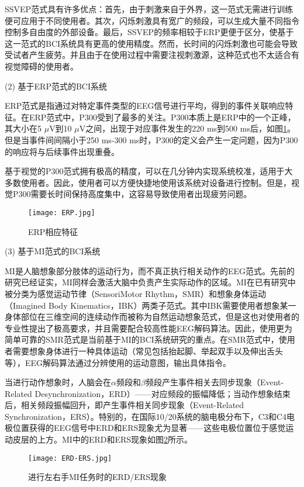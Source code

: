 SSVEP范式具有许多优点：首先，由于刺激来自于外界，这一范式无需进行训练便可应用于不同使用者。其次，闪烁刺激具有宽广的频段，可以生成大量不同指令控制多自由度的外部设备。最后，SSVEP的频率相较于ERP更便于区分，使基于这一范式的BCI系统具有更高的使用精度。然而，长时间的闪烁刺激也可能会导致受试者产生疲劳\cite{1-38}。并且由于在使用过程中需要注视刺激源，这种范式也不太适合有视觉障碍的使用者\cite{1-39, 1-40}。

(2) 基于ERP范式的BCI系统

ERP范式是指通过对特定事件类型的EEG信号进行平均，得到的事件关联响应特征。在ERP范式中，P300受到了最多的关注。P300本质上是ERP中的一个正峰，其大小在5 $\mu $V到10 $\mu $V之间，出现于对应事件发生的220 ms到500 ms后，如图\ref{fig1-4}。但是当事件间间隔小于250 ms-300 ms时，P300的定义会产生一定问题\cite{1-41}，因为P300的响应将与后续事件出现重叠。

基于视觉的P300范式拥有极高的精度，可以在几分钟内实现系统校准，适用于大多数使用者。因此，使用者可以方便快捷地使用该系统对设备进行控制。但是，视觉P300需要长时间保持高度集中，这容易导致使用者出现疲劳问题\cite{1-32,1-42}。

\begin{figure}[h]
	\centering
	\texttt{[image: ERP.jpg]}
	\caption{ERP相应特征}
	\label{fig1-4}
\end{figure}

(3) 基于MI范式的BCI系统

MI是人脑想象部分肢体的运动行为，而不真正执行相关动作的EEG范式。先前的研究已经证实，MI同样会激活大脑中负责产生实际动作的区域\cite{1-43}。MI在已有研究中被分类为感觉运动节律（SensoriMotor Rhythm，SMR）和想象身体运动（Imagined Body Kinematics，IBK）两类子范式。其中IBK需要使用者想象某一身体部位在三维空间的连续动作而被称为自然运动想象范式，但是这也对使用者的专业性提出了极高要求，并且需要配合较高性能EEG解码算法。因此，使用更为简单可靠的SMR范式是当前基于MI的BCI系统研究的重点。在SMR范式中，使用者需要想象身体进行一种具体运动（常见包括抬起脚、举起双手以及伸出舌头等），EEG解码算法通过分辨使用的运动意图，输出具体指令。

当进行动作想象时，人脑会在$\alpha$频段和$\beta$频段产生事件相关去同步现象（Event-Related Desynchronization，ERD）——对应频段的振幅降低；当动作想象结束后，相关频段振幅回升，即产生事件相关同步现象（Event-Related Synchronization，ERS）\cite{4-22,4-23}。特别的，在国际10/20系统的脑电极分布下，C3和C4电极位置获得的EEG信号中ERD和ERS现象尤为显著——这些电极位置位于感觉运动皮层的上方。MI中的ERD和ERS现象如图\ref{fig1-5}所示。

\begin{figure}[h]
	\centering
	\texttt{[image: ERD-ERS.jpg]}
	\caption{进行左右手MI任务时的ERD/ERS现象\cite{1-99}}
	\label{fig1-5}
\end{figure}

